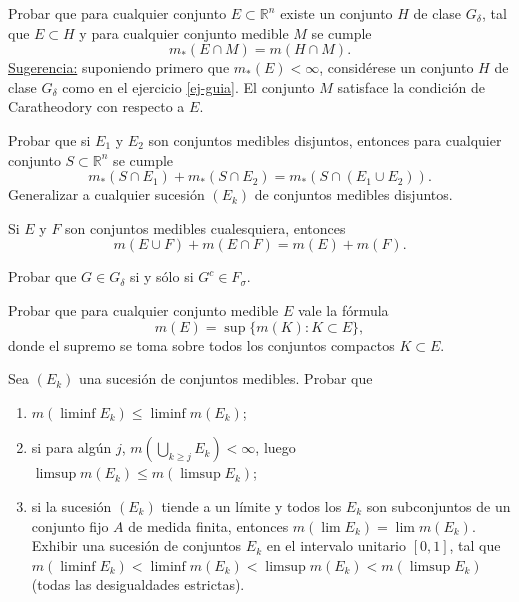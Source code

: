 \documentclass{book}
\newcommand{\rr}{\mathbb{R}}
\newcommand{\di}{\displaystyle}
\begin{document}
  \begin{ejer}{}
	Probar que para cualquier  conjunto $E \subset \rr^n$ existe un conjunto $H$ de
  clase $G_{\delta}$, tal que $E \subset H$ y para cualquier conjunto medible $M$ se cumple
  $$m_*(E \cap M)=m(H\cap M).$$
  \underline{Sugerencia:} suponiendo primero que $m_*(E)<\infty$, considérese un conjunto
  $H$ de clase $G_{\delta}$ como en el ejercicio \ref{ej-guia}. El conjunto $M$ satisface la
  condición de Caratheodory con respecto a $E$.
   \end{ejer} 

   \begin{ejer}{}
	Probar que si $E_1$ y $E_2$ son conjuntos medibles disjuntos, entonces para cualquier
  conjunto $S \subset \rr^n$ se cumple 
  $$m_*(S\cap E_1)+m_*(S\cap E_2)=m_*(S\cap(E_1\cup E_2)). $$
  Generalizar a cualquier sucesión $(E_k)$ de conjuntos medibles disjuntos.
   \end{ejer} 


	 \begin{ejer}{} 
 Si $E$ y $F$ son conjuntos medibles cualesquiera, entonces
  $$m(E \cup F)+m(E \cap F)=m(E)+m(F).$$
	\end{ejer} 

   \begin{ejer}{}  Probar que $G \in G_{\delta}$ si y sólo si $G^c \in F_{\sigma}$.
	\end{ejer} 
%
%

    \begin{ejer}{} 
	Probar que para cualquier conjunto medible $E$ vale la fórmula
   $$m(E)=\sup\{m(K):K\subset E\}, $$
   donde el supremo se toma sobre todos los conjuntos compactos $K \subset E$.
\end{ejer} 

   \begin{ejer}{} 
	Sea $(E_k)$ una sucesión de conjuntos medibles. Probar que
	\begin{enumerate}
    \item $m(\liminf E_k)\leq \liminf m(E_k)$;
    \item si para alg\'un $j$, \;$m(\di\bigcup_{k\geq j}E_k)<\infty$, luego\; 
    $\limsup m(E_k)\leq m(\limsup E_k)$;
    \item si la sucesión $(E_k)$ tiende a un límite y todos los $E_k$ son subconjuntos
    de un conjunto fijo $A$ de medida finita, entonces \;$m(\lim E_k)=\lim m(E_k)$.
    \\
    Exhibir una sucesión de conjuntos $E_k$ en el intervalo unitario $[0,1]$, tal que 
    $m(\liminf E_k)<\liminf m(E_k)<\limsup m(E_k)<m(\limsup E_k)$  (todas las desigualdades estrictas).
	\end{enumerate}
	\end{ejer} 
\end{document}
